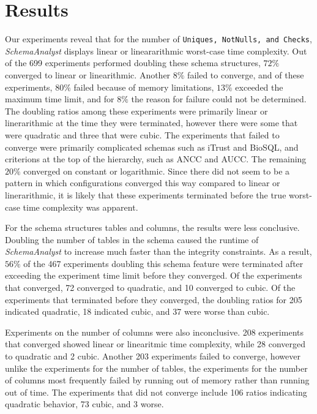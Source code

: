 \section{Results}
  \label{sec:results}



Our experiments reveal that for the number of \texttt{Uniques, NotNulls,
and Checks}, \textit{SchemaAnalyst} displays linear or lineararithmic
worst-case time complexity.  Out of the 699 experiments performed
doubling these schema structures, $72\%$ converged to linear or
linearithmic.  Another $8\%$ failed to converge, and of these experiments,
$80\%$ failed because of memory limitations, $13\%$ exceeded the maximum
time limit, and for $8\%$ the reason for failure could not be
determined.  The doubling ratios among these experiments were primarily
linear or linerarithmic at the time they were terminated, however there
were some that were quadratic and three that were cubic.  The
experiments that failed to converge were primarily complicated schemas
such as iTrust and BioSQL, and criterions at the top of the hierarchy,
such as ANCC and AUCC. The remaining $20\%$ converged on constant or
logarithmic.  Since there did not seem to be a pattern in which
configurations converged this way compared to linear or linerarithmic,
it is likely that these experiments terminated before the true
worst-case time complexity was apparent.


For the schema structures tables and columns, the results were less
conclusive. Doubling the number of tables in the schema caused the
runtime of \textit{SchemaAnalyst} to increase much faster than the
integrity constraints. As a result, $56\%$ of the 467 experiments
doubling this schema feature were terminated after exceeding the
experiment time limit before they converged.  Of the experiments that
converged, 72 converged to quadratic, and 10 converged to cubic.  Of the
experiments that terminated before they converged, the doubling ratios
for 205 indicated quadratic, 18 indicated cubic, and 37 were worse
than cubic. 


Experiments on the number of columns were also inconclusive.  208
experiments that converged showed linear or linearitmic time complexity,
while 28 converged to quadratic and 2 cubic.  Another 203 experiments
failed to converge, however unlike the experiments for the number of
tables, the experiments for the number of columns most frequently failed
by running out of memory rather than running out of time. The
experiments that did not converge include 106 ratios indicating
quadratic behavior, 73 cubic, and 3 worse.


